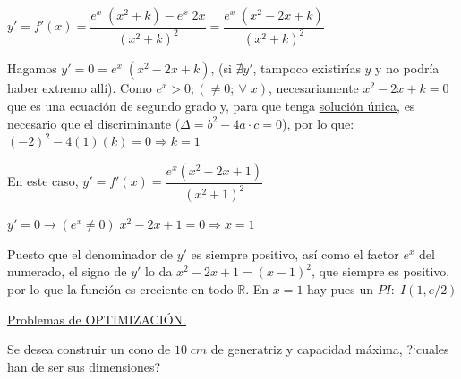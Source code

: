 	\begin{proofw}\renewcommand{\qedsymbol}{$\diamond$}
		

	$y'=f'(x)=\dfrac {e^x \; (x^2+k) - e^x \; 2x }{(x^2+k)^2} = \dfrac {e^x \; (x^2-2x+k) }{(x^2+k)^2}$	
	
	Hagamos $y'=0=e^x \; (x^2-2x+k)$, (si $\nexists y'$, tampoco existirías $y$ y no podría haber extremo allí). Como $e^x>0; (\neq 0 ;\ \forall \; x)$, necesariamente $x^2-2x+k=0$ que es una ecuación de segundo grado y, para que tenga \underline{solución única}, es necesario que el discriminante (\textcolor{gris}{$\Delta=b^2-4a \cdot c=0$}), por lo que: $(-2)^2-4(1)(k)=0 \Rightarrow  k=1$
	
	En este caso, $y'=f'(x)=\dfrac {e^x (x^2-2x+1)}{(x^2+1)^2}$
	
	$y'=0 \to (e^x \neq 0)\; x^2-2x+1=0 \Rightarrow x=1$	
	
	Puesto que el denominador de $y'$ es siempre positivo, así como el factor $e^x$ del numerado, el signo de $y'$ lo da $x^2-2x+1=(x-1)^2$, que siempre es positivo, por lo que la función es creciente en todo $\mathbb R$. En $x=1$ hay pues un $PI:\; I(1,e/2)$

	\end{proofw}



\underline{Problemas de OPTIMIZACIÓN.}

	\begin{ejre} Se desea construir un cono de $10 \; cm$ de generatriz y capacidad máxima, ?`cuales han de ser sus dimensiones?	
	\end{ejre}
	
